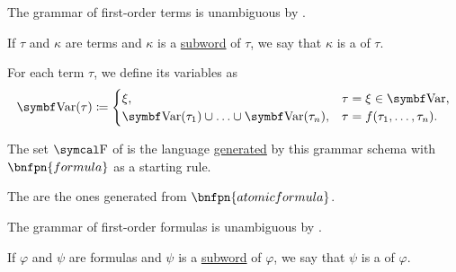 \begin{definition}
\begin{DefEnum}
    The grammar of first-order terms is unambiguous by .

     If \( \tau \) and \( \kappa \) are terms and \( \kappa \) is a \hyperref[def:language/subword]{subword} of \( \tau \), we say that \( \kappa \) is a  of \( \tau \).

     For each term \( \tau \), we define its variables as
    \begin{equation*}
      \Bold{Var}(\tau) \coloneqq \begin{cases}
        \xi,                                                      & \tau = \xi \in \Bold{Var},        \\
        \Bold{Var}(\tau_1) \cup \ldots \cup \Bold{Var}(\tau_n), & \tau = f(\tau_1, \ldots, \tau_n).
      \end{cases}
    \end{equation*}

     The set \( \CF \) of  is the language \hyperref[def:grammar_derivation/grammar_language]{generated} by this grammar schema with \( \bnfpn{formula} \) as a starting rule.

    The  are the ones generated from \( \bnfpn{atomic formula} \).

    The grammar of first-order formulas is unambiguous by .

     If \( \varphi \) and \( \psi \) are formulas and \( \psi \) is a \hyperref[def:language/subword]{subword} of \( \varphi \), we say that \( \psi \) is a  of \( \varphi \).


\end{DefEnum}
\end{definition}
